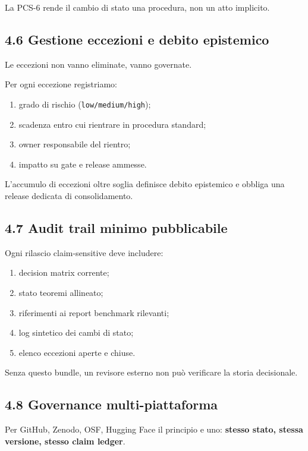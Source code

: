 La PCS-6 rende il cambio di stato una procedura, non un atto implicito.

\subsection{4.6 Gestione eccezioni e debito epistemico}

Le eccezioni non vanno eliminate, vanno governate.

Per ogni eccezione registriamo:

\begin{enumerate}
\def\labelenumi{\arabic{enumi}.}
\tightlist
\item
  grado di rischio (\texttt{low/medium/high});
\item
  scadenza entro cui rientrare in procedura standard;
\item
  owner responsabile del rientro;
\item
  impatto su gate e release ammesse.
\end{enumerate}

L'accumulo di eccezioni oltre soglia definisce debito epistemico e obbliga una release dedicata di consolidamento.

\subsection{4.7 Audit trail minimo pubblicabile}

Ogni rilascio claim-sensitive deve includere:

\begin{enumerate}
\def\labelenumi{\arabic{enumi}.}
\tightlist
\item
  decision matrix corrente;
\item
  stato teoremi allineato;
\item
  riferimenti ai report benchmark rilevanti;
\item
  log sintetico dei cambi di stato;
\item
  elenco eccezioni aperte e chiuse.
\end{enumerate}

Senza questo bundle, un revisore esterno non può verificare la storia decisionale.

\subsection{4.8 Governance multi-piattaforma}

Per GitHub, Zenodo, OSF, Hugging Face il principio e uno: \textbf{stesso stato, stessa versione, stesso claim ledger}.

